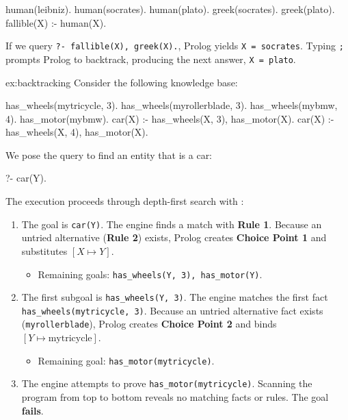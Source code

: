 
\begin{example}{}
\begin{codeblock}
human(leibniz).
human(socrates).
human(plato).
greek(socrates).
greek(plato).
fallible(X) :- human(X).
\end{codeblock}

If we query \texttt{?- fallible(X), greek(X).}, Prolog yields \texttt{X = socrates}. Typing \texttt{;} prompts Prolog to backtrack, producing the next answer, \texttt{X = plato}.
\end{example}

\begin{example}{ex:backtracking}
Consider the following knowledge base:
\begin{codeblock}
has_wheels(mytricycle, 3).
has_wheels(myrollerblade, 3).
has_wheels(mybmw, 4).
has_motor(mybmw).
car(X) :- has_wheels(X, 3), has_motor(X). %
car(X) :- has_wheels(X, 4), has_motor(X). %
\end{codeblock}
We pose the query to find an entity that is a car:
\begin{codeblock}
?- car(Y).
\end{codeblock}
The execution proceeds through depth-first search with :
\begin{enumerate}[label=\textbf{Step \arabic*:}, leftmargin=*]
    \item The goal is \texttt{car(Y)}. The engine finds a match with \textbf{Rule 1}. Because an untried alternative (\textbf{Rule 2}) exists, Prolog creates \textbf{Choice Point 1} and substitutes $[X \mapsto Y]$.
    \begin{itemize}
        \item Remaining goals: \texttt{has\_wheels(Y, 3), has\_motor(Y)}.
    \end{itemize}
    \item The first subgoal is \texttt{has\_wheels(Y, 3)}. The engine matches the first fact \texttt{has\_wheels(mytricycle, 3)}. Because an untried alternative fact exists (\texttt{myrollerblade}), Prolog creates \textbf{Choice Point 2} and binds $[Y \mapsto \text{mytricycle}]$.
    \begin{itemize}
        \item Remaining goal: \texttt{has\_motor(mytricycle)}.
    \end{itemize}
    \item The engine attempts to prove \texttt{has\_motor(mytricycle)}. Scanning the program from top to bottom reveals no matching facts or rules. The goal \textbf{fails}.

\end{enumerate}
\end{example}
